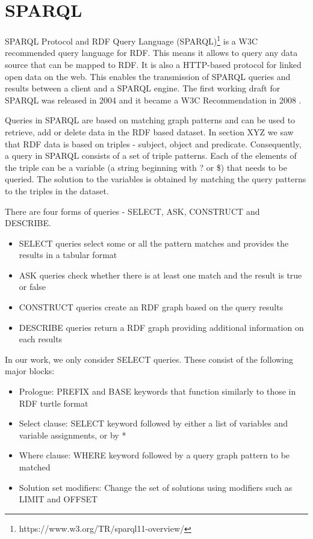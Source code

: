 \section{SPARQL}
SPARQL Protocol and RDF Query Language (SPARQL)\footnote{ https://www.w3.org/TR/sparql11-overview/} is a W3C recommended query language for RDF. This means it allows to query any data source that can be mapped to RDF. It is also a HTTP-based protocol for linked open data on the web. This enables the transmission of SPARQL queries and results between a client and a SPARQL engine. The first working draft for SPARQL was released in 2004 and it became a W3C Recommendation in 2008 \cite{Perez2009}. 

Queries in SPARQL are based on matching graph patterns and can be used to retrieve, add or delete data in the RDF based dataset. In section XYZ we saw that RDF data is based on triples - subject, object and predicate. Consequently, a query in SPARQL consists of a set of triple patterns. Each of the elements of the triple can be a variable (a string beginning with ? or \$) that needs to be queried. The solution to the variables is obtained by matching the query patterns to the triples in the dataset.

There are four forms of queries - SELECT, ASK, CONSTRUCT and DESCRIBE. 
\begin{itemize}
\item SELECT queries select some or all the pattern matches and provides the results in a tabular format
\item ASK queries check whether there is at least one match and the result is true or false
\item CONSTRUCT queries create an RDF graph based on the query results
\item DESCRIBE queries return a RDF graph providing additional information on each results
\end{itemize}

In our work, we only consider SELECT queries. These consist of the following major blocks:
\begin{itemize}
\item Prologue: PREFIX and BASE keywords that function similarly to those in RDF turtle format
\item Select clause: SELECT keyword followed by either a list of variables and variable assignments, or by *
\item Where clause: WHERE keyword followed by a query graph pattern to be matched
\item Solution set modifiers: Change the set of solutions using modifiers such as LIMIT and OFFSET
\end{itemize}

